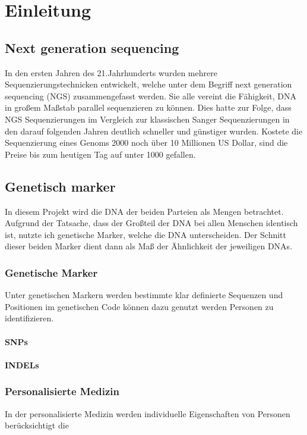 \chapter{Einleitung}
\label{sec:Chapter1}

\section{Next generation sequencing}
In den ersten Jahren des 21.Jahrhunderts wurden mehrere Sequenzierungstechnicken entwickelt, welche unter dem Begriff next generation sequencing (NGS) zusammengefasst werden.
Sie alle vereint die Fähigkeit, DNA in großem Maßstab parallel sequenzieren zu können. 
Dies hatte zur Folge, dass NGS Sequenzierungen im Vergleich zur klassischen Sanger Sequenzierungen in den darauf folgenden Jahren deutlich schneller und günstiger wurden.
Kostete die Sequenzierung eines Genoms 2000 noch über 10 Millionen US Dollar, sind die Preise bis zum heutigen Tag auf unter 1000 gefallen.
  
\section{Genetisch marker}
In diesem Projekt wird die DNA der beiden Parteien als Mengen betrachtet.
Aufgrund der Tatsache, dass der Großteil der DNA bei allen Menschen identisch ist, nutzte ich genetische Marker, welche die DNA unterscheiden.
Der Schnitt dieser beiden Marker dient  dann als Maß der Ähnlichkeit  der jeweiligen DNAs.
\subsection{Genetische Marker}

Unter genetischen Markern werden bestimmte klar definierte Sequenzen und Positionen im genetischen Code können dazu genutzt werden Personen zu identifizieren.

\subsubsection{SNPs}


\subsubsection{INDELs}

\subsection{Personalisierte Medizin}
In der personalisierte Medizin werden individuelle Eigenschaften von Personen berücksichtigt die  



